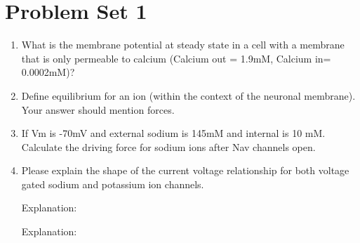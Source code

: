 \documentclass[plain]{inVerba-notes}
\begin{document}
\chapter{Problem Set 1}\label{Problem Set 1}
\begin{enumerate}
    \item What is the membrane potential at steady state in a cell with a membrane that is only permeable to calcium (Calcium out = 1.9mM, Calcium in= 0.0002mM)? 
    
    
    \vspace{80pt}

    \item Define equilibrium for an ion (within the context of the neuronal membrane). Your answer should mention forces.
    
    \vspace{80pt}

    \item If Vm is -70mV and external sodium is 145mM and internal is 10 mM. Calculate the driving force for sodium ions after Nav channels open.
    
    \vspace{120pt}

    \item Please explain the shape of the current voltage relationship for both voltage gated sodium and potassium ion channels.
    
    \bigskip
    
    

    Explanation:
    \vspace{80pt}
    
    

    Explanation:
    \vspace{80pt}

\end{enumerate}
\end{document}
